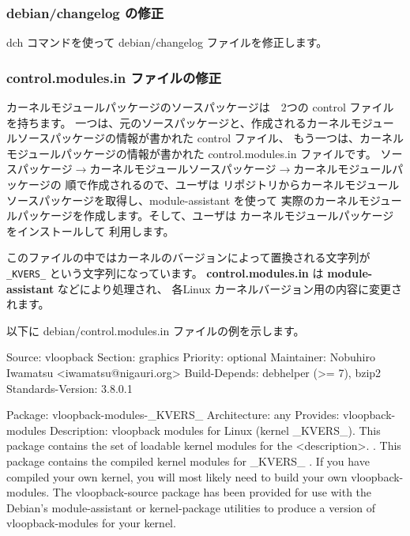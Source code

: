 \documentclass[mingoth,a4paper]{jsarticle}
\begin{document}
\subsubsection{debian/changelog の修正}
dch コマンドを使って debian/changelog ファイルを修正します。

\subsubsection{control.modules.in ファイルの修正}
カーネルモジュールパッケージのソースパッケージは　2つの control ファイルを持ちます。
一つは、元のソースパッケージと、作成されるカーネルモジュールソースパッケージの情報が書かれた control ファイル、
もう一つは、カーネルモジュールパッケージの情報が書かれた control.modules.in ファイルです。
ソースパッケージ$\rightarrow$カーネルモジュールソースパッケージ$\rightarrow$カーネルモジュールパッケージの
順で作成されるので、ユーザは リポジトリからカーネルモジュールソースパッケージを取得し、module-assistant を使って
実際のカーネルモジュールパッケージを作成します。そして、ユーザは カーネルモジュールパッケージをインストールして
利用します。

このファイルの中ではカーネルのバージョンによって置換される文字列が \texttt{\_KVERS\_} という文字列になっています。
{\bf control.modules.in} は {\bf module-assistant} などにより処理され、
各Linux カーネルバージョン用の内容に変更されます。

以下に  debian/control.modules.in ファイルの例を示します。
\begin{commandline}
Source: vloopback
Section: graphics
Priority: optional
Maintainer: Nobuhiro Iwamatsu <iwamatsu@nigauri.org>
Build-Depends: debhelper (>= 7), bzip2
Standards-Version: 3.8.0.1

Package: vloopback-modules-_KVERS_
Architecture: any
Provides: vloopback-modules
Description: vloopback modules for Linux (kernel _KVERS_).
 This package contains the set of loadable kernel modules for the
 <description>.
 .
 This package contains the compiled kernel modules for _KVERS_
 .
 If you have compiled your own kernel, you will most likely need to build
 your own vloopback-modules. The vloopback-source package has been
 provided for use with the Debian's module-assistant or kernel-package
 utilities to produce a version of vloopback-modules for your kernel.
\end{commandline}
\end{document}
